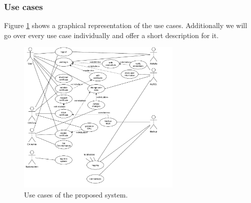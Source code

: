 \documentclass[a4paper, toc=index, 12pt, DIV14, twoside, BCOR2cm, headsepline, numbers=noenddot, bibliography=totoc]{scrbook}
\begin{document}
\subsubsection{Use cases}
Figure \ref{usecase} shows a graphical representation of the use cases. Additionally we will go over every use case individually and offer a short description for it.

\begin{figure}[H]
  \centering
    \includegraphics[width=0.7\textwidth]{images/final_usecases.pdf}  
  \caption{Use cases of the proposed system.}
  \label{usecase}
\end{figure}
\end{document}
